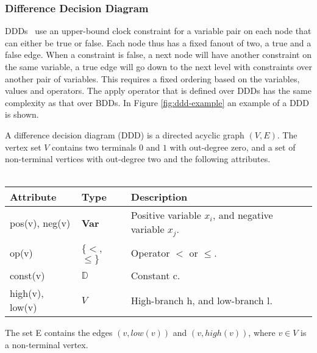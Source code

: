 \subsubsection{Difference Decision Diagram}
DDDs~\cite{ddds, ddd-datastructure-99} use an upper-bound clock constraint for a variable pair on each node that can either be true or false. Each node thus has a fixed fanout of two, a true and a false edge. When a constraint is false, a next node will have another constraint on the same variable, a true edge will go down to the next level with constraints over another pair of variables. This requires a fixed ordering based on the variables, values and operators. The apply operator that is defined over DDDs has the same complexity as that over BDDs. In Figure \ref{fig:ddd-example} an example of a DDD is shown.

\begin{mydef}
\label{def:DDD}
A difference decision diagram (DDD) is a directed acyclic graph $(V,E)$. The vertex set $V$ contains two terminals $0$ and $1$ with out-degree zero, and a set of non-terminal vertices with out-degree two and the following attributes.
\\\\
\begin{tabular}{lll}
Attribute                & Type                      & Description                                           \\\hline
pos(v), neg(v)           & \textbf{Var}              & Positive variable $x_i$, and negative variable $x_j$. \\
op(v)                    & $\{<$, $\leq\}$     & Operator $<$ or $\leq$.                         \\
const(v)                 & $\mathbb{D}$              & Constant c.                                           \\
high(v), low(v)          & $V$                       & High-branch h, and low-branch l.                   
\end{tabular}
The set E contains the edges $(v,low(v))$ and $(v, high(v))$, where $v \in V$ is a non-terminal vertex.
\end{mydef}

